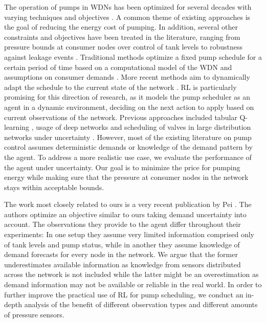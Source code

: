 The operation of pumps in WDNs has been optimized for several decades with
varying techniques and objectives \cite{mala-jetmarova_lost_2017}. A common theme of
existing approaches is the goal of reducing the energy cost of pumping. In
addition, several other constraints and objectives have been treated in the
literature, ranging from pressure bounds at consumer nodes
\cite{hajgato_deep_2020} over control of tank levels \cite{baran_multi-objective_2005} to robustness against leakage events
\cite{giustolisi_operational_2013}.
Traditional methods optimize a fixed pump schedule for a certain
period of time based on a computational model of the WDN and assumptions
on consumer demands \cite{ostfeld_ant_2008}. More recent methods aim to dynamically
adapt the schedule to the current state of the network
\cite{pei_real-time_2025}. RL is particularly promising for this
direction of research, as it models the pump scheduler as an agent in a dynamic
environment, deciding on the next action to apply based on current observations
of the network.
Previous approaches included tabular Q-learning \cite{candelieri_intelligent_2019}, usage of deep networks \cite{hajgato_deep_2020,ma_pump_2024} and scheduling of valves in large distribution networks under uncertainty \cite{belfadil_drl-epanet_2022}.
However, most of the existing literature on
pump control assumes deterministic demands or knowledge of the demand pattern
by the agent. To address a more realistic use case, we evaluate the
performance of the agent under uncertainty. Our goal is to minimize the price
for pumping energy while making sure that the pressure at consumer nodes in
the network stays within acceptable bounds.

The work most closely related to ours is a very recent publication by Pei
\etal \cite{pei_real-time_2025}. The authors optimize an objective similar to
ours taking demand uncertainty into account. The
observations they provide to the agent differ throughout their experiments: In
one setup they assume very limited information comprised only of tank levels
and pump status, while in another they assume knowledge of demand forecasts
for every node in the network. We argue that the former underestimates
available information as knowledge from sensors distributed across the network
is not included while the latter might be an overestimation as demand information may not be available or reliable in the real world. %
In order to further improve the practical use of RL for
pump scheduling, we conduct an in-depth analysis of the benefit of different observation types and different amounts of pressure sensors.
